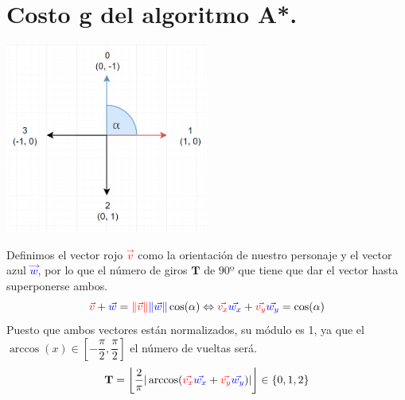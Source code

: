 \documentclass[12pt,a4paper]{report}
\newcommand\norm[1]{\left\lVert#1\right\rVert}
\begin{document}
	\section{Costo g del algoritmo A*.}
	\begin{center}
		\includegraphics[width=0.5\textwidth]{axis.png}
	\end{center}
	Definimos el vector rojo \textcolor{red}{$\vec{v}$} como la orientación de nuestro personaje y el vector azul \textcolor{blue}{$\vec{w}$}, por lo que el número de giros $\mathbf{T}$ de $90º$ que tiene que dar el vector hasta superponerse ambos. 
	\[
		\textcolor{red}{\vec{v}}+\textcolor{blue}{\vec{w}}=\textcolor{red}{\norm{\vec{v}}}\textcolor{blue}{\norm{\vec{w}}}\cos(\alpha) \Leftrightarrow \textcolor{red}{\vec{v_x}}\textcolor{blue}{\vec{w_x}}+\textcolor{red}{\vec{v_y}}\textcolor{blue}{\vec{w_y}}=\cos(\alpha)
	\]
	Puesto que ambos vectores están normalizados, su módulo es 1, ya que el $\arccos(x)\in\left[-\dfrac{\pi}{2}, \dfrac{\pi}{2}\right]$ el número de vueltas será. 
	\[
		\mathbf{T} = \left\lfloor \dfrac{2}{\pi} \vert\arccos(\textcolor{red}{\vec{v_x}}\textcolor{blue}{\vec{w_x}}+\textcolor{red}{\vec{v_y}}\textcolor{blue}{\vec{w_y}})\vert\right\rfloor \in \{0, 1, 2\}
	\]
	\newpage
\end{document}
